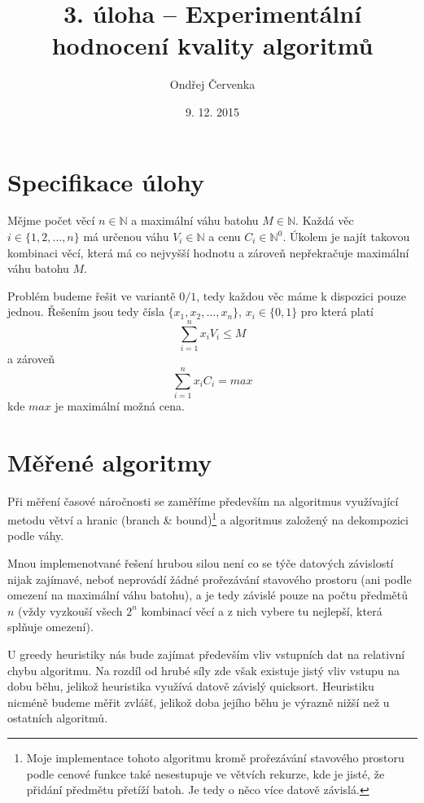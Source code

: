 \documentclass[11pt]{article}
\begin{document}
\title{3. úloha -- Experimentální hodnocení kvality algoritmů}
\author{Ondřej Červenka}
\date{9. 12. 2015}
\maketitle

\section{Specifikace úlohy}

Mějme počet věcí $n \in \mathbb{N}$ a maximální váhu batohu $M \in \mathbb{N}$. \newline Každá věc $i \in \{1, 2, \ldots, n\}$ má určenou váhu $V_i \in \mathbb{N}$ a cenu $C_i \in \mathbb{N}^0$. Úkolem je najít takovou kombinaci věcí, která má co nejvyšší hodnotu a zároveň nepřekračuje maximální váhu batohu $M$.

Problém budeme řešit ve variantě $0/1$, tedy každou věc máme k dispozici pouze jednou. Řešením jsou tedy čísla $\{x_1, x_2, \ldots, x_n\}$, $x_i \in \{0,1\}$ pro která platí $$\sum_{i=1}^n x_iV_i \leq M$$ a zároveň $$\sum_{i=1}^n x_iC_i = max $$ kde $max$ je maximální možná cena.

\section{Měřené algoritmy}
\label{sec:alg}

Při měření časové náročnosti se zaměříme především na algoritmus využívající metodu větví a hranic (branch \& bound)\footnote{Moje implementace tohoto algoritmu kromě prořezávání stavového prostoru podle cenové funkce také nesestupuje ve větvích rekurze, kde je jisté, že přidání předmětu přetíží batoh. Je tedy o něco více datově závislá.} a algoritmus založený na dekompozici podle váhy. 

Mnou implemenotvané řešení hrubou silou není co se týče datových závislostí nijak zajímavé, neboť neprovádí žádné prořezávání stavového prostoru (ani podle omezení na maximální váhu batohu), a je tedy závislé pouze na počtu předmětů $n$ (vždy vyzkouší všech $2^n$ kombinací věcí a z nich vybere tu nejlepší, která splňuje omezení).

U greedy heuristiky nás bude zajímat především vliv vstupních dat na relativní chybu algoritmu. Na rozdíl od hrubé síly zde však existuje jistý vliv vstupu na dobu běhu, jelikož heuristika využívá datově závislý quicksort. Heuristiku nicméně budeme měřit zvlášť, jelikož doba jejího běhu je výrazně nižší než u ostatních algoritmů.
\end{document}
